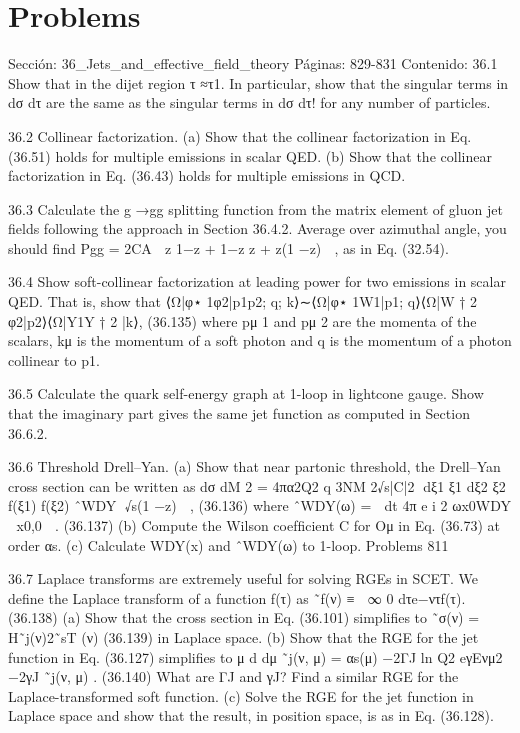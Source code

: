 \section*{Problems}
Sección: 36_Jets_and_effective_field_theory
Páginas: 829-831
Contenido:
36.1 Show that in the dijet region τ ≈τ1. In particular, show that the singular terms in
dσ
dτ are the same as the singular terms in dσ
dτ! for any number of particles.

36.2 Collinear factorization.
(a) Show that the collinear factorization in Eq. (36.51) holds for multiple emissions
in scalar QED.
(b) Show that the collinear factorization in Eq. (36.43) holds for multiple emissions
in QCD.

36.3 Calculate the g →gg splitting function from the matrix element of gluon jet ﬁelds
following the approach in Section 36.4.2. Average over azimuthal angle, you should
ﬁnd Pgg = 2CA

z
1−z + 1−z
z
+ z(1 −z)

, as in Eq. (32.54).

36.4 Show soft-collinear factorization at leading power for two emissions in scalar QED.
That is, show that
⟨Ω|φ⋆
1φ2|p1p2; q; k⟩∼⟨Ω|φ⋆
1W1|p1; q⟩⟨Ω|W †
2 φ2|p2⟩⟨Ω|Y1Y †
2 |k⟩,
(36.135)
where pμ
1 and pμ
2 are the momenta of the scalars, kμ is the momentum of a soft
photon and q is the momentum of a photon collinear to p1.

36.5 Calculate the quark self-energy graph at 1-loop in lightcone gauge. Show that the
imaginary part gives the same jet function as computed in Section 36.6.2.

36.6 Threshold Drell–Yan.
(a) Show that near partonic threshold, the Drell–Yan cross section can be written as
dσ
dM 2 =
4πα2Q2
q
3NM 2√s|C|2
 dξ1
ξ1
dξ2
ξ2
f(ξ1) f(ξ2) ˆWDY
√s(1 −z)

, (36.136)
where
ˆWDY(ω) =

dt
4π e
i
2 ωx0WDY

x0,⃗0

.
(36.137)
(b) Compute the Wilson coefﬁcient C for Oμ in Eq. (36.73) at order αs.
(c) Calculate WDY(x) and ˆWDY(ω) to 1-loop.
Problems
811

36.7 Laplace transforms are extremely useful for solving RGEs in SCET. We deﬁne the
Laplace transform of a function f(τ) as
˜f(ν) ≡
 ∞
0
dτe−ντf(τ).
(36.138)
(a) Show that the cross section in Eq. (36.101) simpliﬁes to
˜σ(ν) = H˜j(ν)2˜sT (ν)
(36.139)
in Laplace space.
(b) Show that the RGE for the jet function in Eq. (36.127) simpliﬁes to
μ d
dμ
˜j(ν, μ) = αs(μ)
−2ΓJ ln
Q2
eγEνμ2 −2γJ
˜j(ν, μ) .
(36.140)
What are ΓJ and γJ? Find a similar RGE for the Laplace-transformed soft
function.
(c) Solve the RGE for the jet function in Laplace space and show that the result, in
position space, is as in Eq. (36.128).

